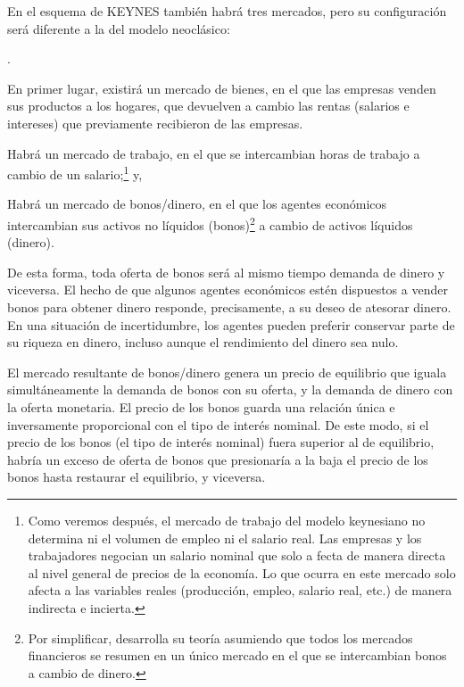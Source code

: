 \documentclass[10pt,a4paper]{article}
\newcounter{numitem}
\newenvironment{lnum}
      {\begin{list}{\arabic{numitem}.}{%
          \usecounter{numitem}%
          \setlength{\leftmargin}{1cm}%
          \setlength{\parskip}{3pt}%
          \setlength{\itemsep}{0pt}%
          \setlength{\parsep}{0pt}%
      }}
      {\end{list}}
\begin{document}
En el esquema de KEYNES también habrá tres mercados, pero su configuración será diferente a la del modelo neoclásico:
\begin{lnum}
    \item En primer lugar, existirá un mercado de bienes, en el que las empresas venden sus productos a los hogares, que devuelven a cambio las rentas (salarios e intereses) que previamente recibieron de las empresas.
    \item Habrá un mercado de trabajo, en el que se intercambian horas de trabajo a cambio de un salario;\footnote{%
        Como veremos después, el mercado de trabajo del modelo keynesiano no determina ni el volumen de empleo ni el salario real. Las empresas y los trabajadores negocian un salario nominal que solo a fecta de manera directa al nivel general de precios de la economía. Lo que ocurra en este mercado solo afecta a las variables reales (producción, empleo, salario real, etc.) de manera indirecta e incierta.
    } y,
    \item Habrá un mercado de bonos/dinero, en el que los agentes económicos intercambian sus activos no líquidos (bonos)\footnote{%
        Por simplificar, desarrolla su teoría asumiendo que todos los mercados financieros se resumen en un único mercado en el que se intercambian bonos a cambio de dinero.
    } a cambio de activos líquidos (dinero). 
\end{lnum} 

De esta forma, toda oferta de bonos será al mismo tiempo demanda de dinero y viceversa. El hecho de que algunos agentes económicos estén dispuestos a vender bonos para obtener dinero responde, precisamente, a su deseo de atesorar dinero. En una situación de incertidumbre, los agentes pueden preferir conservar parte de su riqueza en dinero, incluso aunque el rendimiento del dinero sea nulo. 

El mercado resultante de bonos/dinero genera un precio de equilibrio que iguala simultáneamente la demanda de bonos con su oferta, y la demanda de dinero con la oferta monetaria. El precio de los bonos guarda una relación única e inversamente proporcional con el tipo de interés nominal.  De este modo, si el precio de los bonos (el tipo de interés nominal) fuera superior al de equilibrio, habría un exceso de oferta de bonos que presionaría a la baja el precio de los bonos hasta restaurar el equilibrio, y viceversa. 
\end{document}

